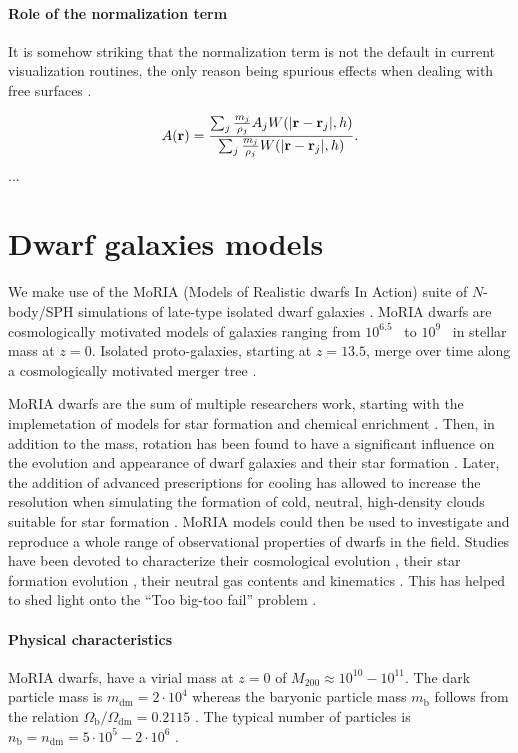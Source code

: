 \paragraph{Role of the normalization term}
It is somehow striking that the normalization term is not the default in current visualization routines, the only reason being spurious effects when dealing with free surfaces \citep{Price2007}.

\begin{equation}
 A(\boldsymbol{\mathbf{r}}) = \dfrac{\sum_j \frac{m_j}{\rho_j} A_j W(|\boldsymbol{\mathbf{r}} - \boldsymbol{\mathbf{r}}_j|,h)}{\sum_j \frac{m_j}{\rho_j} W(|\boldsymbol{\mathbf{r}} - \boldsymbol{\mathbf{r}}_j|,h)}.
\end{equation}
...

\section{Dwarf galaxies models}
We make use of the MoRIA (Models of Realistic dwarfs In Action) suite of $N$-body/SPH simulations of late-type isolated dwarf galaxies \citep{Verbeke2017}.
MoRIA dwarfs are cosmologically motivated models of galaxies ranging from $10^{6.5}$~\Msun{} to $10^9$~\Msun{} in stellar mass at $z=0$.
Isolated proto-galaxies, starting at $z = 13.5$, merge over time along a cosmologically motivated merger tree \citep{Cloet-Osselaer2014}.

MoRIA dwarfs are the sum of multiple researchers work, starting with the implemetation of models for star formation and chemical enrichment \citep{Valcke2008}. 
Then, in addition to the mass, rotation has been found to have a significant influence on the evolution and appearance of dwarf galaxies and their star formation \citep{Schroyen2011}.
Later, the addition of advanced prescriptions for cooling has allowed to increase the resolution when simulating the formation of cold, neutral, high-density clouds suitable for star formation \citep{DeRijcke2013}. %
MoRIA models could then be used to investigate and reproduce a whole range of observational properties of dwarfs in the field.
Studies have been devoted to characterize their cosmological evolution \citep{Cloet-Osselaer2012}, their star formation evolution \citep{Verbeke2015}, their neutral gas contents and kinematics \citep{Koleva2014}.
This has helped to shed light onto the ``Too big-too fail'' problem \citep{Verbeke2017}.


\paragraph{Physical characteristics} MoRIA dwarfs, have a virial mass at $z=0$ of $M_{200} \approx 10^{10} - 10^{11}$\Msun{}. The dark particle mass is $m_{\mathrm{dm}} = 2 \cdot 10^4$ \Msun{} whereas the baryonic particle mass $m_{\mathrm{b}}$ follows from the relation $\Omega_\mathrm{b}/\Omega_{\mathrm{dm}} = 0.2115$ \citep{Planck2015}.
The typical number of particles is $n_\mathrm{b} = n_{\mathrm{dm}} = 5 \cdot 10^5 - 2 \cdot 10^6$ \Msun{}.

